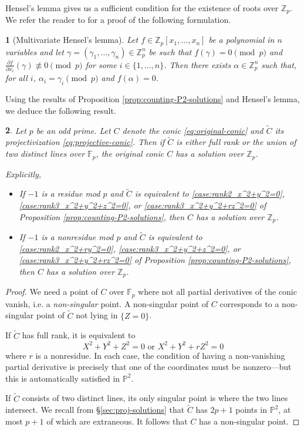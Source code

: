 \documentclass[10pt,a4paper]{amsart}
\numberwithin{equation}{section}
\numberwithin{figure}{section}
\theoremstyle{definition}
\theoremstyle{remark}
\theoremstyle{plain}
\newtheorem{thm}{\protect\theoremname}[section]
\theoremstyle{plain}
\theoremstyle{definition}
\newtheorem{defn}{\protect\definitionname}[section]
\theoremstyle{plain}
\theoremstyle{plain}
\providecommand{\definitionname}{Definition}
\providecommand{\theoremname}{Theorem}
\renewcommand{\P}{\mathbb{P}}
\newcommand{\F}{\mathbb{F}}
\newcommand{\Z}{\mathbb{Z}}
\newcommand{\Q}{\mathbb{Q}}
\begin{document}
	Hensel's lemma gives us a sufficient condition for the existence of roots over $\Z_p$. We refer the reader to \cite{henselMO} for a proof of the following formulation.
	\begin{thm}[Multivariate Hensel's lemma]\label{thm:hensels-one-eq}
		Let $f \in \Z_p[x_1,\ldots,x_n]$ be a polynomial in $n$ variables and let $\gamma = (\gamma_1,\ldots,\gamma_n)\in \Z_p^n$ be such that $f(\gamma) = 0 \pmod p$ and $\frac{\partial f}{\partial x_i}(\gamma) \not\equiv 0 \pmod p$ for some $i\in \{1,\ldots,n\}$. Then there exists $\alpha \in \Z_p^n$ such that, for all $i$, $\alpha_i = \gamma_i \pmod p$ and $f(\alpha) = 0$.
	\end{thm}
	Using the results of Proposition \ref{prop:counting-P2-solutions} and Hensel's lemma, we deduce the following result.
	\begin{thm}\label{thm:existence-over-Zp}
		Let $p$ be an odd prime. Let $C$ denote the conic \eqref{eq:original-conic} and $\widetilde{C}$ its projectivization \eqref{eq:projective-conic}. Then if $\widetilde{C}$ is either full rank or the union of two distinct lines over $\F_p$, the original conic $C$ has a solution over $\Z_p$.
		
		Explicitly,
		\begin{itemize}
			\item If $-1$ is a residue mod $p$ and $\widetilde{C}$ is equivalent to \eqref{case:rank2_x^2+y^2=0}, \eqref{case:rank3_x^2+y^2+z^2=0}, or \eqref{case:rank3_x^2+y^2+rz^2=0} of Proposition \ref{prop:counting-P2-solutions}, then $C$ has a solution over $\Z_p$.
			\item If $-1$ is a nonresidue mod $p$ and $\widetilde{C}$ is equivalent to \eqref{case:rank2_x^2+ry^2=0}, \eqref{case:rank3_x^2+y^2+z^2=0}, or \eqref{case:rank3_x^2+y^2+rz^2=0} of Proposition \ref{prop:counting-P2-solutions}, then $C$ has a solution over $\Z_p$.
		\end{itemize}
	\end{thm}
	\begin{proof}
		We need a point of $C$ over $\F_p$ where not all partial derivatives of the conic vanish, i.e. a \emph{non-singular} point. A non-singular point of $C$ corresponds to a non-singular point of $\widetilde{C}$ not lying in $\{Z=0\}$.
		
		If $\widetilde{C}$ has full rank, it is equivalent to
		\[
		X^2 + Y^2 + Z^2 = 0 \text{ or } X^2 + Y^2 + rZ^2 = 0
		\]
		where $r$ is a nonresidue. In each case, the condition of having a non-vanishing partial derivative is precisely that one of the coordinates must be nonzero---but this is automatically satisfied in $\P^2$.
		
		If $\widetilde{C}$ consists of two distinct lines, its only singular point is where the two lines intersect. We recall from \S\ref{sec:proj-solutions} that $\widetilde{C}$ has $2p+1$ points in $\P^2$, at most $p+1$ of which are extraneous. It follows that $C$ has a non-singular point.
	\end{proof}
\end{document}
